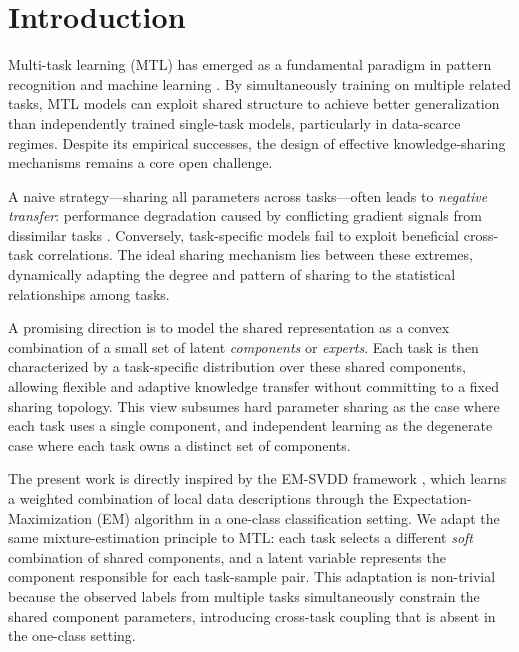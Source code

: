 \documentclass[preprint,12pt]{elsarticle}
\begin{document}
	\section{Introduction}
	
	Multi-task learning (MTL) has emerged as a fundamental paradigm in
	pattern recognition and machine learning \citep{caruana1997multitask,
		zhang2021survey}. By simultaneously training on multiple related tasks,
	MTL models can exploit shared structure to achieve better generalization
	than independently trained single-task models, particularly in
	data-scarce regimes. Despite its empirical successes, the design of
	effective knowledge-sharing mechanisms remains a core open challenge.
	
	A naive strategy---sharing all parameters across tasks---often leads to
	\emph{negative transfer}: performance degradation caused by conflicting
	gradient signals from dissimilar tasks \citep{yu2020gradient}.
	Conversely, task-specific models fail to exploit beneficial cross-task
	correlations. The ideal sharing mechanism lies between these extremes,
	dynamically adapting the degree and pattern of sharing to the
	statistical relationships among tasks.
	
	A promising direction is to model the shared representation as a
	convex combination of a small set of latent \emph{components} or
	\emph{experts}. Each task is then characterized by a task-specific
	distribution over these shared components, allowing flexible and
	adaptive knowledge transfer without committing to a fixed sharing
	topology. This view subsumes hard parameter sharing \citep{caruana1997multitask}
	as the case where each task uses a single component, and independent
	learning as the degenerate case where each task owns a distinct set of
	components.
	
	The present work is directly inspired by the EM-SVDD framework
	\citep{eghdami2021sparsity}, which learns a weighted combination of
	local data descriptions through the Expectation-Maximization (EM)
	algorithm in a one-class classification setting. We adapt the same
	mixture-estimation principle to MTL: each task selects a different
	\emph{soft} combination of shared components, and a latent
	variable represents the component responsible for each task-sample pair.
	This adaptation is non-trivial because the observed labels from multiple
	tasks simultaneously constrain the shared component parameters,
	introducing cross-task coupling that is absent in the one-class setting.
	
\end{document}
